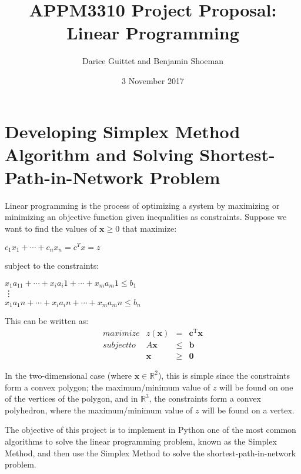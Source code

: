 \documentclass[11pt]{article}
\title{APPM3310 Project Proposal: Linear Programming}
\author{Darice Guittet and Benjamin Shoeman}
\date{3 November 2017}
\begin{document}
\maketitle

\section{Developing Simplex Method Algorithm and Solving Shortest-Path-in-Network Problem}

Linear programming is the process of optimizing a system by maximizing or minimizing an objective function given inequalities as constraints. Suppose we want to find the values of $\mathbf{x} \geq 0$ that maximize:

\begin{centering}
     $c_1x_1 + \cdots + c_nx_n = c^Tx = z$\\
\end{centering}

subject to the constraints:

\begin{centering}
    $x_1a_11 +  \cdots + x_ia_i1 + \cdots +  x_ma_m1 \leq b_1$ \\
\hspace{0cm} \vdots \\
    $x_1a_1n + \cdots + x_ia_in + \cdots +  x_ma_mn \leq b_n$ \\
\end{centering} 
\hfill \break
This can be written as:
\begin{equation} \label{eq:linprog}
    \begin{array}{rccl}
        maximize & z(\mathbf{x}) & = & \mathbf{c}^\text{T} \mathbf{x} \\
        subject to & A \mathbf{x} & \leq & \mathbf{b} \\
        & \mathbf{x} & \geq & \mathbf{0}
    \end{array}
\end{equation}

In the two-dimensional case (where $\mathbf{x} \in \mathbb{R}^2$), this is simple since the constraints form a convex polygon; the maximum/minimum value of $z$ will be found on one of the vertices of the polygon, and in $\mathbb{R}^3$, the constraints form a convex polyhedron, where the maximum/minimum value of $z$ will be found on a vertex.

The objective of this project is to implement in Python one of the most common algorithms to solve the linear programming problem, known as the Simplex Method, and then use the Simplex Method to solve the shortest-path-in-network problem.
\end{document}

